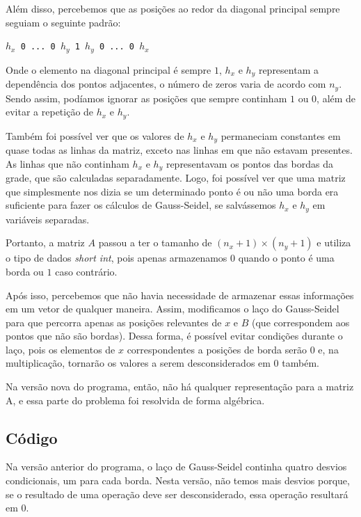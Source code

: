 \documentclass[12pt]{article}
\begin{document}
	Além disso, percebemos que as posições ao redor da diagonal principal sempre seguiam o seguinte padrão:
	
	\begin{center}
		\texttt{$h_x$ 0 ... 0 $h_y$ 1 $h_y$ 0 ... 0 $h_x$}
	\end{center}
	
	Onde o elemento na diagonal principal é sempre $1$, $h_x$ e $h_y$ representam a dependência dos pontos adjacentes, o número de zeros varia de acordo com $n_y$.
	Sendo assim, podíamos ignorar as posições que sempre continham $1$ ou $0$, além de evitar a repetição de $h_x$ e $h_y$.
	
	Também foi possível ver que os valores de $h_x$ e $h_y$ permaneciam constantes em quase todas as linhas da matriz, exceto nas linhas em que não estavam presentes.
	As linhas que não continham $h_x$ e $h_y$ representavam os pontos das bordas da grade, que são calculadas separadamente.
	Logo, foi possível ver que uma matriz que simplesmente nos dizia se um determinado ponto é ou não uma borda era suficiente para fazer os cálculos de Gauss-Seidel, se salvássemos $h_x$ e $h_y$ em variáveis separadas.
	
	Portanto, a matriz $A$ passou a ter o tamanho de $(n_x+1)\times(n_y+1)$ e utiliza o tipo de dados \emph{short int}, pois apenas armazenamos $0$ quando o ponto é uma borda ou $1$ caso contrário.
	
	Após isso, percebemos que não havia necessidade de armazenar essas informações em um vetor de qualquer maneira.
	Assim, modificamos o laço do Gauss-Seidel para que percorra apenas as posições relevantes de $x$ e $B$ (que correspondem aos pontos que não são bordas).
	Dessa forma, é possível evitar condições durante o laço, pois os elementos de $x$ correspondentes a posições de borda serão $0$ e, na multiplicação, tornarão os valores a serem desconsiderados em $0$ também.
	
	Na versão nova do programa, então, não há qualquer representação para a matriz A, e essa parte do problema foi resolvida de forma algébrica.

	\subsection{Código}
	
	Na versão anterior do programa, o laço de Gauss-Seidel continha quatro desvios condicionais, um para cada borda.
	Nesta versão, não temos mais desvios porque, se o resultado de uma operação deve ser desconsiderado, essa operação resultará em $0$.
	
\end{document}
